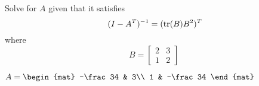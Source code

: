 
\begin{Exercise}[
name={},
title={}, 
difficulty=0,
origin={\cite{YL}}]
Solve for $A$ given that it satisfies
\[
(I-A^T)^{-1} = (\operatorname{tr}(B)B^2)^T
\]
where
\[
B=
\begin{bmatrix}
2 & 3\\
1 & 2
\end{bmatrix}\;
\]

\end{Exercise}

\begin{Answer}
$
A=
\begin{mat}
-\frac34 & 3\\
1 & -\frac34
\end{mat}
$
\end{Answer}
